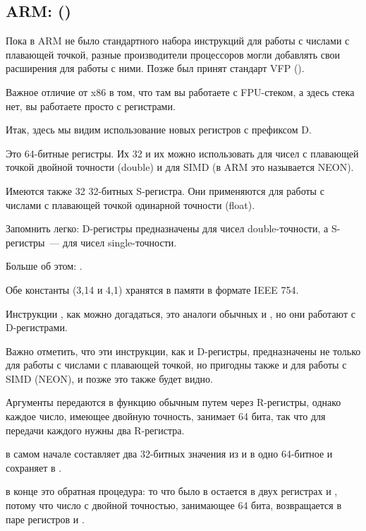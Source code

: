 \subsection{ARM: \OptimizingXcodeIV (\ARMMode)}

Пока в ARM не было стандартного набора инструкций для работы с числами с плавающей точкой, разные производители процессоров
могли добавлять свои расширения для работы с ними.
Позже был принят стандарт VFP ().

Важное отличие от x86 в том, что там вы работаете с FPU-стеком, а здесь стека нет, вы работаете просто с регистрами.



Итак, здесь мы видим использование новых регистров с префиксом D.

Это 64-битные регистры. Их 32 и их можно
использовать для чисел с плавающей точкой двойной точности (double) и для 
SIMD (в ARM это называется NEON).

Имеются также 32 32-битных S-регистра. Они применяются для работы с числами 
с плавающей точкой одинарной точности (float).

Запомнить легко: D-регистры предназначены для чисел double-точности, 
а S-регистры~--- для чисел single-точности.

Больше об этом: .

Обе константы (3,14 и 4,1) хранятся в памяти в формате IEEE 754.

Инструкции  \AndENRU {}, как можно догадаться, это аналоги обычных  и \MOV, но они работают с D-регистрами.

Важно отметить, что эти инструкции, как и D-регистры, предназначены не только для работы 
с числами с плавающей точкой, но пригодны также и для работы с SIMD (NEON), и позже это также будет видно.

Аргументы передаются в функцию обычным путем через R-регистры, однако 
каждое число, имеющее двойную точность, занимает 64 бита, так что для передачи каждого нужны два R-регистра.

 в самом начале составляет два 32-битных значения из  и  в одно 64-битное и сохраняет в .

 в конце это обратная процедура: то что было в  
остается в двух регистрах  и , потому что число с двойной точностью, 
занимающее 64 бита, возвращается в паре регистров  и .

